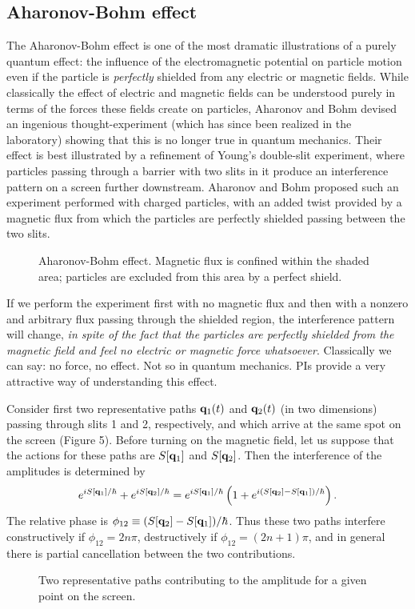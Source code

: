 \documentclass[12pt]{article}
\begin{document}
\subsection{Aharonov-Bohm effect}
The Aharonov-Bohm effect is one of the most dramatic illustrations of
a purely quantum effect: the influence of the electromagnetic
potential on particle motion even if the particle is {\em perfectly}
shielded from any electric or magnetic fields. While classically the
effect of electric and magnetic fields can be understood purely in
terms of the forces these fields create on particles, Aharonov and
Bohm devised an ingenious thought-experiment (which has since been
realized in the laboratory) showing that this is no longer true in
quantum mechanics. Their effect is best illustrated by a refinement of
Young's double-slit experiment, where particles passing through a
barrier with two slits in it produce an interference
pattern on a screen further downstream.
Aharonov and Bohm proposed such an experiment performed with
charged particles, with an added twist provided
by a magnetic flux from which
the particles are perfectly shielded passing between the two slits.
\begin{figure}[ht]
\epsfysize=7cm
\centerline{}
\caption[Aharonov-Bohm effect.]{Aharonov-Bohm effect. Magnetic flux
is confined within the shaded area; particles are excluded from
this area by a perfect shield.}
\end{figure}
If we perform the experiment first with no magnetic flux and then with
a nonzero and arbitrary flux passing through the shielded region, the
interference pattern will change, {\em in spite of the fact that the
  particles are perfectly shielded from the magnetic field and feel no
  electric or magnetic force whatsoever}. Classically we can say: no
force, no effect. Not so in quantum mechanics.
PIs provide a very attractive way of
understanding this effect.

Consider first two representative
paths ${\mathbf q}_1(t)$ and ${\mathbf q}_2(t)$ (in two dimensions)
passing through slits 1 and 2, respectively, and which arrive at
the same spot on the screen (Figure 5). 
Before turning on the magnetic field,
let us suppose that the actions for these paths are $S[{\mathbf q}_1]$ and
$S[{\mathbf q}_2]$. Then the interference of the amplitudes is determined by
\[ 
e^{iS[{\mathbf q}_1]/\hbar}+e^{iS[{\mathbf q}_2]/\hbar}
=e^{iS[{\mathbf q}_1]/\hbar}
\left(1+e^{i(S[{\mathbf q}_2]-S[{\mathbf q}_1])/\hbar}\right).
\]
The relative phase is $\phi_{12}\equiv(S[{\mathbf q}_2]-S[{\mathbf q}_1])/\hbar$. 
Thus these two paths
interfere constructively if $\phi_{12}=2n\pi$,
destructively if $\phi_{12}=(2n+1)\pi$, and in general there is partial
cancellation between the two contributions.
\begin{figure}[ht]
\epsfysize=5cm
\centerline{}
\caption{Two representative paths contributing to the amplitude for a
  given point on the screen.}
\end{figure}
\end{document}

